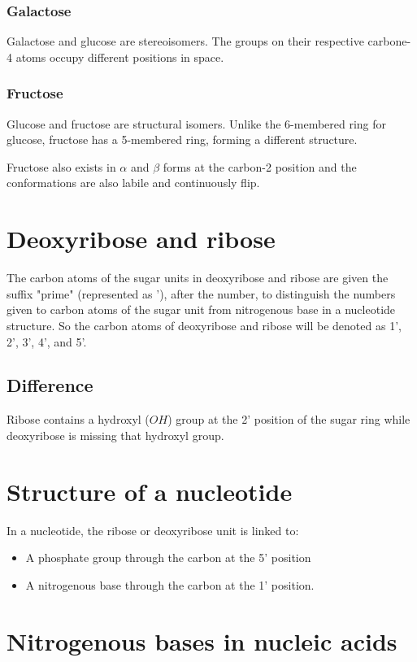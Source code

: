 \documentclass[11pt]{article}
\begin{document}
\subsubsection{Galactose}
\label{sec:org9de1dce}
Galactose and glucose are stereoisomers. The groups on their respective carbone-4 atoms occupy different positions in space.

\newpage
\subsubsection{Fructose}
\label{sec:org424053e}
Glucose and fructose are structural isomers. Unlike the 6-membered ring for glucose, fructose has a 5-membered ring, forming a different structure.


Fructose also exists in \(\alpha\) and \(\beta\) forms at the carbon-2 position and the conformations are also labile and continuously flip.
\section{Deoxyribose and ribose}
\label{sec:org65ac975}
The carbon atoms of the sugar units in deoxyribose and ribose are given the suffix "prime" (represented as '), after the number, to distinguish the numbers given to carbon atoms of the sugar unit from nitrogenous base in a nucleotide structure. So the carbon atoms of deoxyribose and ribose will be denoted as 1', 2', 3', 4', and 5'.
\subsection{Difference}
\label{sec:org6ea202a}
Ribose contains a hydroxyl (\(OH\)) group at the 2' position of the sugar ring while deoxyribose is missing that hydroxyl group.
\section{Structure of a nucleotide}
\label{sec:org555dc20}
In a nucleotide, the ribose or deoxyribose unit is linked to:
\begin{itemize}
\item A phosphate group through the carbon at the 5' position
\item A nitrogenous base through the carbon at the 1' position.
\end{itemize}
\section{Nitrogenous bases in nucleic acids}
\label{sec:orga4a0285}
\end{document}
